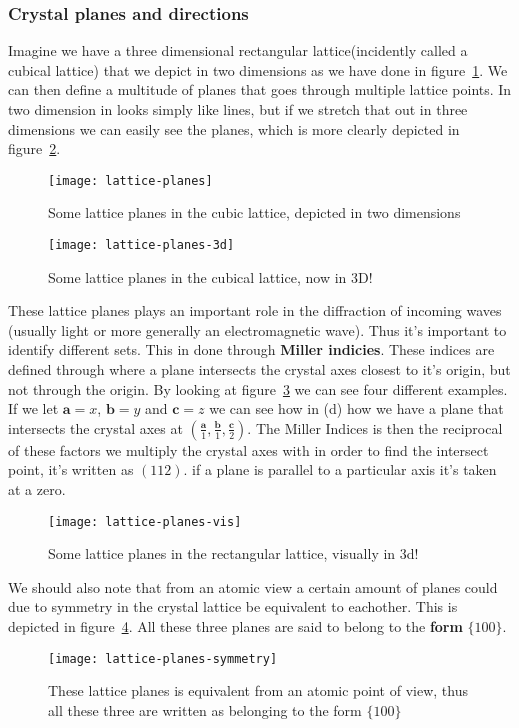 \documentclass[11pt]{article}
\begin{document}
\subsubsection{Crystal planes and directions}
Imagine we have a three dimensional rectangular lattice(incidently called a cubical lattice) that we depict in two dimensions as we have done in figure~\ref{fig:lattice-planes}. We can then define a multitude of planes that goes through multiple lattice points. In two dimension in looks simply like lines, but if we stretch that out in three dimensions we can easily see the planes, which is more clearly depicted in figure~\ref{fig:lattice-planes-3d}.
\begin{figure}[H]
	\centering
	\texttt{[image: lattice-planes]}
	\caption{Some lattice planes in the cubic lattice, depicted in two dimensions}
	\label{fig:lattice-planes}
\end{figure}
\begin{figure}[H]
	\centering
	\texttt{[image: lattice-planes-3d]}
	\caption{Some lattice planes in the cubical lattice, now in 3D!}
	\label{fig:lattice-planes-3d}
\end{figure}

\newpage
These lattice planes plays an important role in the diffraction of incoming waves (usually light or more generally an electromagnetic wave). Thus it's important to identify different sets. This in done through \textbf{Miller indicies}. These indices are defined through where a plane intersects the crystal axes closest to it's origin, but not through the origin. By looking at figure~\ref{fig:lattice-planes-vis} we can see four different examples. If we let $\mathbf{a} = x$, $\mathbf{b}=y$ and $\mathbf{c} =z$ we can see how in (d) how we have a plane that intersects the crystal axes at $(\frac{\mathbf{a}}{1},\frac{\mathbf{b}}{1}, \frac{\mathbf{c}}{2})$. The Miller Indices is then the reciprocal of these factors we multiply the crystal axes with in order to find the intersect point, it's written as $(1 1 2)$. if a plane is parallel to a particular axis it's taken at a zero. 

\begin{figure}[H]
	\centering
	\texttt{[image: lattice-planes-vis]}
	\caption{Some lattice planes in the rectangular lattice, visually in 3d!}
	\label{fig:lattice-planes-vis}
\end{figure}

\newpage
We should also note that from an atomic view a certain amount of planes could due to symmetry in the crystal lattice be equivalent to eachother. This is depicted in figure~\ref{fig:lattice-planes-symmetry}. All these three planes are said to belong to the \textbf{form} $\{100\}$.
\begin{figure}[H]
	\centering
	\texttt{[image: lattice-planes-symmetry]}
	\caption{These lattice planes is equivalent from an atomic point of view, thus all these three are written as belonging to the form $\{100\}$}
	\label{fig:lattice-planes-symmetry}
\end{figure}
\end{document}
